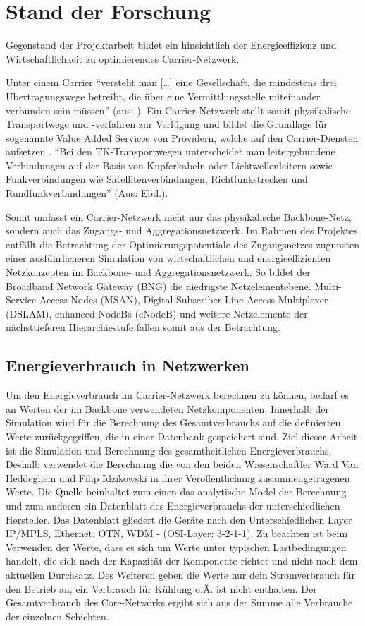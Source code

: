 
\section{Stand der Forschung}
Gegenstand der Projektarbeit bildet ein hinsichtlich der Energieeffizienz und Wirtschaftlichkeit zu optimierendes Carrier-Netzwerk.

Unter einem Carrier "`versteht man […] eine Gesellschaft, die mindestens drei Übertra\-gungs\-wege betreibt, die über eine Vermittlungsstelle miteinander verbunden sein müssen"' (aus: \cite{carrier}). Ein Carrier-Netzwerk stellt somit physikalische Transportwege und -verfahren zur Verfügung und bildet die Grundlage für sogenannte Value Added Services von Providern, welche auf den Carrier-Diensten aufsetzen \cite{fassnacht}. "`Bei den TK-Transportwegen unterscheidet man leitergebundene Verbindungen auf der Basis von Kupferkabeln oder Lichtwellenleitern sowie Funkverbindungen wie Satellitenverbindungen, Richtfunkstrecken und Rundfunkverbindungen"' (Aus: Ebd.).

Somit umfasst ein Carrier-Netzwerk nicht nur das physikalische Backbone-Netz, sondern auch das Zugangs- und Aggregationsnetzwerk. Im Rahmen des Projektes entfällt die Betrachtung der Optimierungspotentiale des Zugangsnetzes zugunsten einer aus\-führ\-lich\-eren Simulation von wirtschaftlichen und energieeffizienten Netzkonzepten im Backbone- und Aggregationsnetzwerk. So bildet der Broadband Network Gateway (BNG) die niedrigste Netzelementebene. Multi-Service Access Nodes (MSAN), Digital Subscriber Line Access Multiplexer (DSLAM), enhanced NodeBs (eNodeB) und weitere Netzelemente der nächsttieferen Hierarchiestufe fallen somit aus der Betrachtung.


\subsection{Energieverbrauch in Netzwerken}
Um den Energieverbrauch im Carrier-Netzwerk berechnen zu können, bedarf es an Werten der im Backbone verwendeten Netzkomponenten. Innerhalb der Simulation wird für die Berechnung des Gesamtverbrauchs auf die definierten Werte zurückgegriffen, die in einer Datenbank gespeichert sind. Ziel dieser Arbeit ist die Simulation und Berechnung des gesamtheitlichen Energieverbrauchs. Deshalb verwendet die Berechnung die von den beiden Wissenschaftler Ward Van Heddeghem und Filip Idzikowski in ihrer Veröffentlichung \cite{vanhedde} zusammengetragenen Werte. Die Quelle beinhaltet zum einen das analytische Model der Berechnung und zum anderen ein Datenblatt \cite{vanhsheet} des Energieverbrauchs der unterschiedlichen Hersteller. Das Datenblatt gliedert die Geräte nach den Unterschiedlichen Layer IP/MPLS, Ethernet, OTN, WDM - (OSI-Layer: 3-2-1-1). Zu beachten ist beim Verwenden der Werte, dass es sich um Werte unter typischen Lastbedingungen handelt, die sich nach der Kapazität der Komponente richtet und nicht nach dem aktuellen Durchsatz. Des Weiteren geben die Werte nur dein Stromverbrauch für den Betrieb an, ein Verbrauch für Kühlung o.Ä. ist nicht enthalten.
Der Gesamtverbrauch des Core-Networks ergibt sich aus der Summe alle Verbrauche der einzelnen Schichten. 

